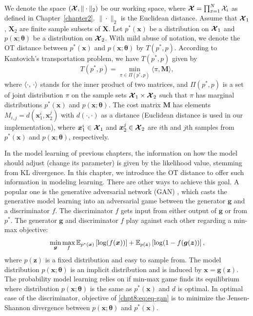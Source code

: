 We denote the space $(\bm{\mathcal{X}},\|\cdot\|_2)$ be our working space, where $\bm{\mathcal{X}} = \prod_{x=1}^{N} \mathcal{X}_i$ as defined in Chapter~\ref{chapter2}. $\|\cdot\|_2$ is the Euclidean distance. Assume that $\bm{\mathcal{X}}_1$, $\bm{X}_2$ are finite sample subsets of $\bm{X}$. Let $p^{\ast}(\bm{x})$ be a distribution on $\bm{\mathcal{X}}_1$ and $p(\bm{x};\bm{\theta})$ be a distribution on $\bm{\mathcal{X}}_2$.
With mild abuse of notation, we denote the OT distance between $p^{\ast}(\bm{x})$ and $p(\bm{x}; \bm{\theta})$ by $T(p^{\ast},p)$. According to Kantovich's transportation problem\cite{villani2003topics}, we have $T(p^{\ast},p)$ given by
\begin{equation}\label{chpt8:eq:ot}
  T(p^{\ast}, p) = \min_{\pi\in\Pi(p^{\ast}, p)}\langle\pi,\bm{M}\rangle,
\end{equation}
where $\langle \cdot,\,\cdot\rangle$ stands for the inner product of
two matrices, and $\Pi(p^{\ast},p)$ is a set of joint distribution $\pi$ on
the sample sets $\bm{\mathcal{X}}_1\times\bm{\mathcal{X}}_2$ such that $\pi$ has
marginal distributions $p^{\ast}(\bm{x})$ and $p(\bm{x}; \bm{\theta})$. 
The cost matrix $\bm{M}$ has elements $M_{i,j} = d(\bm{x}_1^{i}, \bm{x}_2^{j})$ with $d(\cdot, \cdot)$ as a distance (Euclidean distance is used in our implementation), where $\bm{x}_1^{i}\in\bm{\mathcal{X}}_1$ and $\bm{x}_2^{j}\in \bm{\mathcal{X}}_2$ are $i$th and $j$th samples from $p^{\ast}(\bm{x})$ and $p(\bm{x}; \bm{\theta})$, respectively. 


\begin{remark}
  In the model learning of previous chapters, the information on how the model should adjust (change its parameter) is given by the likelihood value, stemming from KL divergence. In this chapter, we introduce the OT distance to offer such information in modeling learning. There are other ways to achieve this goal. A popular one is the generative adversarial network (GAN) \cite{NIPS2014_5423, 2017arXiv170100160G}, which casts the generative model learning into an adversarial game between the generator $\bm{g}$ and a discriminator $f$.
The {discriminator} $f$ gets input from either output of $\bm{g}$ or from
$p^{\ast}$. The generator $\bm{g}$ and discriminator ${f}$ play against each other
regarding a min-max objective:
\begin{equation}\label{chpt8:eq:eq-gan}
  \min_{\bm{g}} \max_f \mathbb{E}_{p^{\ast}(\bm{x})}\left[ \log(f(\bm{x})) \right] + \mathbb{E}_{p(\bm{z})}\left[ \log(1-f(\bm{g}(\bm{z})) \right],
\end{equation}
where $p(\bm{z})$ is a fixed distribution and easy to sample from. The model distribution $p(\bm{x}; \bm{\theta})$ is an implicit distribution and is induced by $\bm{x} = \bm{g}(\bm{z})$.
The probability model learning relies on if min-max game finds
its equilibrium where distribution $p(\bm{x}; \bm{\theta})$ is the same as $p^{\ast}(\bm{x})$ and
$d$ is optimal. In optimal case of the discriminator, objective of
\eqref{chpt8:eq:eq-gan} is to minimize the Jensen-Shannon divergence between $p(\bm{x}; \bm{\theta})$ and $p^{\ast}(\bm{x})$.
\end{remark}


